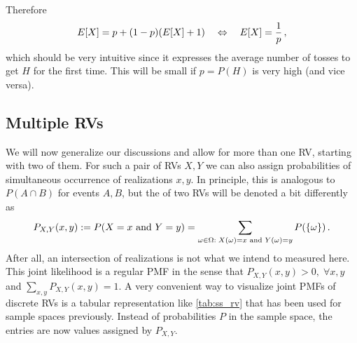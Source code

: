 \begin{ex}[Memorylessness]
Therefore
\begin{equation*}
E[X] = p + (1 - p) \qty(E[X] + 1) \quad \Leftrightarrow \quad E[X] = \frac{1}{p} \, ,
\end{equation*}
which should be very intuitive since it expresses the average number of tosses to get $H$ for the first time. This will be small if $p = P(H)$ is very high (and vice versa).
\end{ex}



	\subsection{Multiple RVs}
We will now generalize our discussions and allow for more than one RV, starting with two of them. For such a pair of RVs $X, Y$ we can also assign probabilities of simultaneous occurrence of realizations $x, y$. In principle, this is analogous to $P(A \cap B)$ for events $A, B$, but the  of two RVs will be denoted a bit differently as
\begin{equation}
P_{X, Y}(x, y) := P(X = x \text{ and } Y = y) = \sum_{\omega \in \Omega: \; X(\omega) = x \text{ and } Y(\omega) = y} P(\qty{\omega}) \, .
\end{equation}
After all, an intersection of realizations is not what we intend to measured here. This joint likelihood is a regular PMF in the sense that $P_{X, Y}(x, y) > 0, \; \forall x, y$ and $\sum_{x, y} P_{X, Y}(x, y) = 1$. A very convenient way to visualize joint PMFs of discrete RVs is a tabular representation like \ref{tab:ss_rv} that has been used for sample spaces previously. Instead of probabilities $P$ in the sample space, the entries are now values assigned by $P_{X, Y}$.



